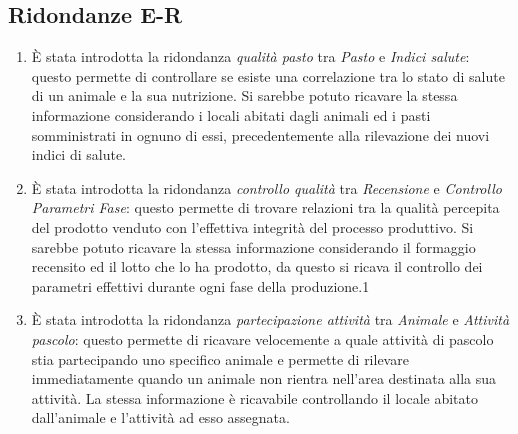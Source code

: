 \documentclass[12pt,a4paper]{article}
\begin{document}
\subsection{Ridondanze E-R}
\label{subsec:ridondanze-ent-rel}

\begin{enumerate}

\item \`E stata introdotta la ridondanza \textit{qualità pasto} tra \textit{Pasto} e \textit{Indici salute}: questo permette di controllare se esiste una correlazione tra lo stato di salute di un animale e la sua nutrizione. Si sarebbe potuto ricavare la stessa informazione considerando i locali abitati dagli animali ed i pasti somministrati in ognuno di essi, precedentemente alla rilevazione dei nuovi indici di salute.
\item \`E stata introdotta la ridondanza \textit{controllo qualità} tra \textit{Recensione} e \textit{Controllo Parametri Fase}: questo permette di trovare relazioni tra la qualità percepita del prodotto venduto con l'effettiva integrità del processo produttivo. Si sarebbe potuto ricavare la stessa informazione considerando il formaggio recensito ed il lotto che lo ha prodotto, da questo si ricava il controllo dei parametri effettivi durante ogni fase della produzione.1
\item \`E stata introdotta la ridondanza \textit{partecipazione attività} tra \textit{Animale} e \textit{Attività pascolo}: questo permette di ricavare velocemente a quale attività di pascolo stia partecipando uno specifico animale e permette di rilevare immediatamente quando un animale non rientra nell'area destinata alla sua attività. La stessa informazione è ricavabile controllando il locale abitato dall'animale e l'attività ad esso assegnata.

\end{enumerate}
\end{document}
